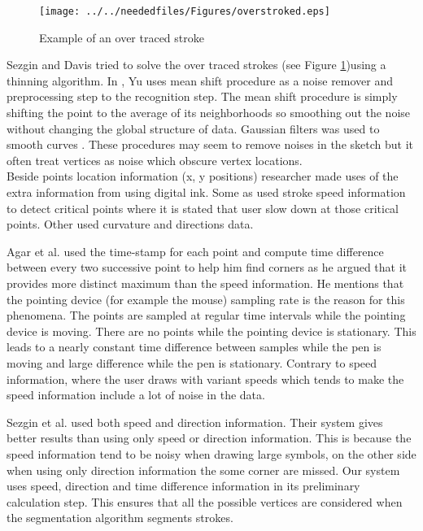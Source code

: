 \begin{figure}
	\centering
		\texttt{[image: ../../neededfiles/Figures/overstroked.eps]}
	\caption[Example of an over traced stroke]{Example of an over traced stroke \cite{overtraced24}}
	\label{fig:overstroked}
\end{figure} 

 Sezgin and Davis \cite{overtraced24} tried to solve the over traced strokes (see Figure \ref {fig:overstroked})using a thinning algorithm. In \cite{meanshift10,domainindependent17}, Yu uses mean shift procedure as a noise remover and preprocessing step to the recognition step. The mean shift procedure is simply shifting the point to the average of its neighborhoods so smoothing out the noise without changing the global structure of data. Gaussian filters was used to smooth curves \cite {Phoenix88}. These procedures may seem to remove noises in the sketch but it often treat vertices as noise which obscure vertex locations. \\
Beside points location information (x, y positions) researcher made uses of the extra information from using digital ink. Some as \cite{mulitstroke5,polygonfeedback31} used stroke speed information to detect critical points where it is stated that user slow down at those critical points. Other used curvature and directions data. %

 Agar et al. \cite{polygonfeedback31} used the time-stamp for each point and compute time difference between every two successive point to help him find corners as he argued that it provides more distinct maximum than the speed information. He mentions that the pointing device (for example the mouse) sampling rate is the reason for this phenomena. The points are sampled at regular time intervals while the pointing device is moving. There are no points while the pointing device is stationary. This leads to a nearly constant time difference between samples while the pen is moving and large difference while the pen is stationary. Contrary to speed information, where the user draws with variant speeds which tends to make the speed information include a lot of noise in the data.
  
Sezgin et al.\cite{earlyprocess} used both speed and direction information. Their system gives better results than using only speed or direction information. This is because the speed information tend to be noisy when drawing large symbols, on the other side when using only direction information the some corner are missed. Our system uses speed, direction and time difference information in its preliminary calculation step. This ensures that all the possible vertices are considered when the segmentation algorithm segments strokes. %
 


